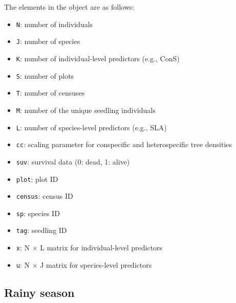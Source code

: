 \documentclass[
  11pt,
  letterpaper,
  DIV=11,
  numbers=noendperiod]{scrartcl}
\begin{document}
The elements in the object are as follows:

\begin{itemize}
\item
  \texttt{N}: number of individuals
\item
  \texttt{J}: number of species
\item
  \texttt{K}: number of individual-level predictors (e.g., ConS)
\item
  \texttt{S}: number of plots
\item
  \texttt{T}: number of censuses
\item
  \texttt{M}: number of the unique seedling individuals
\item
  \texttt{L}: number of species-level predictors (e.g., SLA)
\item
  \texttt{cc}: scaling parameter for conspecific and heterospecific tree
  densities
\item
  \texttt{suv}: survival data (0: dead, 1: alive)
\item
  \texttt{plot}: plot ID
\item
  \texttt{census}: census ID
\item
  \texttt{sp}: species ID
\item
  \texttt{tag}: seedling ID
\item
  \texttt{x}: N \(\times\) L matrix for individual-level predictors
\item
  \texttt{u}: N \(\times\) J matrix for species-level predictors
\end{itemize}

\hypertarget{rainy-season}{%
\subsection{Rainy season}\label{rainy-season}}
\end{document}
